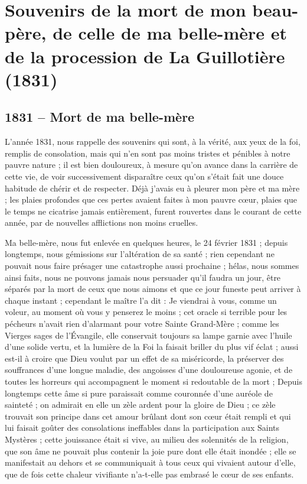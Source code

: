 \documentclass[11pt,a4paper]{report}
\begin{document}
\chapter{Souvenirs de la mort de mon beau-père, de celle de ma belle-mère et de la procession de La Guillotière (1831)}

\section*{1831 -- Mort de ma belle-mère}

L'année 1831, nous rappelle des souvenirs qui sont, à la vérité, aux yeux de la foi, remplis de consolation, mais qui n'en sont pas moins tristes et pénibles à notre pauvre nature ; il est bien douloureux, à mesure qu'on avance dans la carrière de cette vie, de voir successivement disparaître ceux qu'on s'était fait une douce habitude de chérir et de respecter. Déjà j'avais eu à pleurer mon père et ma mère ; les plaies profondes que ces pertes avaient faites à mon pauvre cœur, plaies que le temps ne cicatrise jamais entièrement, furent rouvertes dans le courant de cette année, par de nouvelles afflictions non moins cruelles.

Ma belle-mère, nous fut enlevée en quelques heures, le 24 février 1831 ; depuis longtemps, nous gémissions sur l'altération de sa santé ; rien cependant ne pouvait nous faire présager une catastrophe aussi prochaine ; hélas, nous sommes ainsi faits, nous ne pouvons jamais nous persuader qu'il faudra un jour, être séparés par la mort de ceux que nous aimons et que ce jour funeste peut arriver à chaque instant ; cependant le maître l'a dit : Je viendrai à vous, comme un voleur, au moment où vous y penserez le moins ; cet oracle si terrible pour les pécheurs n'avait rien d'alarmant pour votre Sainte Grand-Mère ; comme les Vierges sages de l'Évangile, elle conservait toujours sa lampe garnie avec l'huile d'une solide vertu, et la lumière de la Foi la faisait briller du plus vif éclat ; aussi est-il à croire que Dieu voulut par un effet de sa miséricorde, la préserver des souffrances d'une longue maladie, des angoisses d'une douloureuse agonie, et de toutes les horreurs qui accompagnent le moment si redoutable de la mort ; Depuis longtemps cette âme si pure paraissait comme couronnée d'une auréole de sainteté ; on admirait en elle un zèle ardent pour la gloire de Dieu ; ce zèle trouvait son principe dans cet amour brûlant dont son cœur était rempli et qui lui faisait goûter des consolations ineffables dans la participation aux Saints Mystères ; cette jouissance était si vive, au milieu des solennités de la religion, que son âme ne pouvait plus contenir la joie pure dont elle était inondée ; elle se manifestait au dehors et se communiquait à tous ceux qui vivaient autour d'elle, que de fois cette chaleur vivifiante n'a-t-elle pas embrasé le cœur de ses enfants.
\end{document}
